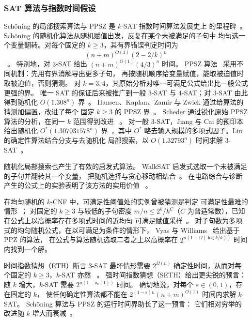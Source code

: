 \documentclass[11pt,reqno]{amsart}
\numberwithin{equation}{section}
\theoremstyle{definition}\newtheorem{definition}[theorem]{定义}
\theoremstyle{remark}\newtheorem{remark}[theorem]{注}
\renewcommand{\le}{\leqslant}
\renewcommand{\ge}{\geqslant}
\begin{document}
\subsubsection{SAT 算法与指数时间假设}\label{subsec:related-sat}
Sch\"oning 的局部搜索算法与 PPSZ 是 $k$-SAT 指数时间算法发展史上
的里程碑~\cite{Schon99,PPSZ05}。
Sch\"oning 的随机化算法从随机赋值出发，反复在某个未被满足的子句中
均匀选一个变量翻转。对每个固定的 $k\ge3$，其有界错误判定时间为
\[
 (n+m)^{O(1)}(2-2/k)^n
\]
~\cite[Section~2]{Schon99}。
特别地，对 $3$-SAT 给出 $(n+m)^{O(1)}(4/3)^n$ 时间。
PPSZ 算法~\cite{PPSZ05} 采用不同机制：先用有界消解导出更多子句，
再按随机顺序给变量赋值，能取被迫值时取被迫值，否则猜测。
对 $k=3,4$，其原始分析对唯一可满足公式给出比一般公式更强的界。
唯一 SAT 的保证后来被推广到一般 $3$-SAT 与 $4$-SAT；对 $3$-SAT
由此得到随机化 $O(1.308^n)$ 界~\cite{Hertli14}。
Hansen、Kaplan、Zamir 与 Zwick 通过给算法的猜测加偏置，改进了每个
固定 $k\ge3$ 的 PPSZ 界~\cite{HKZZ19}。
Scheder 通过锐化原始 PPSZ 算法的分析，在同一 $k$ 范围得到改进
~\cite[Theorem~1.5]{Scheder24}。
对一般 $3$-SAT，Jiang 与 Cai 的预印本给出随机化
$O^*(1.307031578^n)$ 界~\cite[Corollary~1.2]{JC26}，其中 $O^*$
略去输入规模的多项式因子。Liu 的确定性算法结合分支与去随机化
局部搜索，以 $O(1.32793^n)$ 时间求解 $3$-SAT~\cite[Theorem~21]{Liu18}。

随机化局部搜索也产生了有效的启发式算法。
WalkSAT 启发式选取一个未被满足的子句并翻转其一个变量，
把随机选择与贪心移动相结合~\cite{SKC94}。
在电路综合与诊断产生的公式上的实验表明了该方法的实用价值
~\cite[pp.~340--342, Tables~4--5]{SKC94}。

在均匀随机的 $k$-CNF 中，可满足性阈值处的实例曾被猜测是判定
可满足性最难的情形~\cite[Section~1]{VW21}；
对固定的 $k\ge3$ 与较低的子句密度 $m/n\le 2^k/k^C$（$C$
为普适常数），已知在公式上以高概率存在多项式时间的近均匀
可满足赋值采样~\cite[Theorem~1.2]{CLWYY25}。
对子句数为多项式的均匀随机公式，在以可满足为条件的情形下，
Vyas 与 Williams~\cite[Theorem~3]{VW21} 给出基于 PPZ 的算法，
在公式与算法随机选取二者之上以高概率在
$2^{n(1-\Omega(\log k/k))}$ 时间内找到一个解。

时间指数猜想（ETH）断言 $3$-SAT 最坏情形需要 $2^{\Omega(n)}$
确定性时间，从而对每个固定的 $k\ge3$，$k$-SAT 亦然
~\cite[Theorem~1]{IP01}。
强时间指数猜想（SETH）给出更尖锐的预言：随 $k$ 增大，$k$-SAT
需要 $2^{n(1-o_k(1))}$ 时间。
确切地说，对每个 $\varepsilon\in(0,1)$，存在固定的 $k$，
使任何确定性算法都不能在 $2^{(1-\varepsilon)n}(n+m)^{O(1)}$
时间内求解 $k$-SAT。
Sch\"oning 算法与 PPSZ 的运行时间界助长了这一预言：
它们相对穷举的改进随 $k$ 增大而衰减~\cite[Open Problems, item~2]{IP01}。
\end{document}

